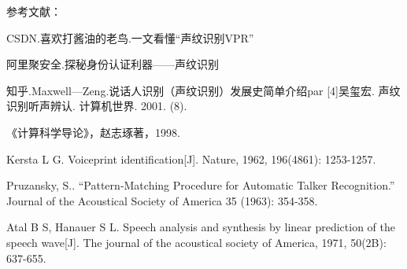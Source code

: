 \documentclass{article}
\begin{document}
参考文献：\par 
[1]CSDN.喜欢打酱油的老鸟.一文看懂“声纹识别VPR”\par 
[2]阿里聚安全.探秘身份认证利器——声纹识别\par 
[3]知乎.Maxwell—Zeng.说话人识别（声纹识别）发展史简单介绍par 	 
[4]吴玺宏. 声纹识别听声辨认. 计算机世界. 2001. (8).\par 
[5]《计算科学导论》，赵志琢著，1998.\par 
[6]Kersta L G. Voiceprint identification[J]. Nature, 1962, 196(4861): 1253-1257.\par 
[7]Pruzansky, S.. “Pattern‐Matching Procedure for Automatic Talker Recognition.” Journal of the Acoustical Society of America 35 (1963): 354-358.\par 
[8]Atal B S, Hanauer S L. Speech analysis and synthesis by linear prediction of the speech wave[J]. The journal of the acoustical society of America, 1971, 50(2B):  637-655.\par 
\end{document}
